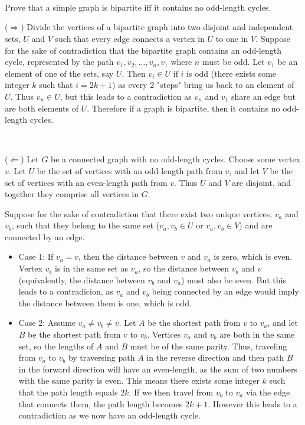 \documentclass{article}
\begin{document}
\
\hline
\section{}

\begin{problem*}
Prove that a simple graph is bipartite iff it contains no odd-length cycles.
\end{problem*}

($\Rightarrow $) Divide the vertices of a bipartite graph into two disjoint and independent sets, $U$ and $V$ such that every edge connects a vertex in $U$ to one in $V$. Suppose for the sake of contradiction that the bipartite graph contains an odd-length cycle, represented by the path $v_{1} ,v_{2} ,\dotsc ,v_{n} ,v_{1}$ where $n$ must be odd. Let $v_{1}$ be an element of one of the sets, say $U$. Then $v_{i} \in U$ if $i$ is odd (there exists some integer $k$ such that $i=2k+1$) as every 2 "steps" bring us back to an element of $U$. Thus $v_{n} \in U$, but this leads to a contradiction as $v_{n}$ and $v_{1}$ share an edge but are both elements of $U$. Therefore if a graph is bipartite, then it contains no odd-length cycles.

\

($\Leftarrow $) Let $G$ be a connected graph with no odd-length cycles. Choose some vertex $v$. Let $U$ be the set of vertices with an odd-length path from $v$, and let $V$ be the set of vertices with an even-length path from $v$. Thus $U$ and $V$ are disjoint, and together they comprise all vertices in $G$.

Suppose for the sake of contradiction that there exist two unique vertices, $v_{a}$ and $v_{b}$, such that they belong to the same set ($v_{a} ,v_{b} \in U$ or $v_{a} ,v_{b} \in V$) and are connected by an edge. 
\begin{itemize}
\item Case 1: If $v_{a} =v$, then the distance between $v$ and $v_{a}$ is zero, which is even. Vertex $v_{b}$ is in the same set as $v_{a}$, so the distance between $v_{b}$ and $v$ (equivalently, the distance between $v_{b}$ and $v_{a}$) must also be even. But this leads to a contradicion, as $v_{a}$ and $v_{b}$ being connected by an edge would imply the distance between them is one, which is odd.
\item Case 2: Assume $v_{a} \neq v_{b} \neq v$. Let $A$ be the shortest path from $v$ to $v_{a}$, and let $B$ be the shortest path from $v$ to $v_{b}$. Vertices $v_{a}$ and $v_{b}$ are both in the same set, so the lengths of $A$ and $B$ must be of the same parity. Thus, traveling from $v_{a}$ to $v_{b}$ by traversing path $A$ in the reverse direction and then path $B$ in the forward direction will have an even-length, as the sum of two numbers with the same parity is even. This means there exists some integer $k$ such that the path length equals $2k$. If we then travel from $v_{b}$ to $v_{a}$ via the edge that connects them, the path length becomes $2k+1$. However this leads to a contradiction as we now have an odd-length cycle.
\end{itemize}
\end{document}

